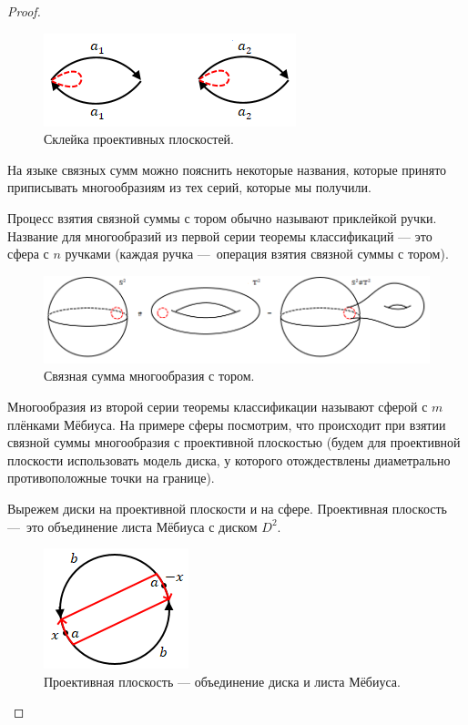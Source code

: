 \begin{proof}
    \begin{figure}[htbp]
        \centering
        \includegraphics[scale=0.7]{images/c11.6.png}
        \caption{Склейка проективных плоскостей.}
        \label{fig:c11.6}
    \end{figure}

    На языке связных сумм можно пояснить некоторые названия, которые принято приписывать многообразиям из тех серий, которые мы получили.

    Процесс взятия связной суммы с тором обычно называют приклейкой ручки. Название для многообразий из первой серии теоремы классификаций — это сфера с $n$ ручками (каждая ручка — операция взятия связной суммы с тором).

    \begin{figure}[htbp]
        \centering
        \includegraphics[scale=0.5]{images/c11.7.png}
        \caption{Связная сумма многообразия с тором.}
        \label{fig:c11.7}
    \end{figure}

    Многообразия из второй серии теоремы классификации называют сферой с $m$ плёнками Мёбиуса. На примере сферы посмотрим, что происходит при взятии связной суммы многообразия с проективной плоскостью (будем для проективной плоскости использовать модель диска, у которого отождествлены диаметрально противоположные точки на границе).

    Вырежем диски на проективной плоскости и на сфере. Проективная плоскость — это объединение листа Мёбиуса с диском $D^2$.

    \begin{figure}[htbp]
        \centering
        \includegraphics[scale=0.7]{images/c11.8.png}
        \caption{Проективная плоскость — объединение диска и листа Мёбиуса.}
        \label{fig:c11.8}
    \end{figure}


\end{proof}
